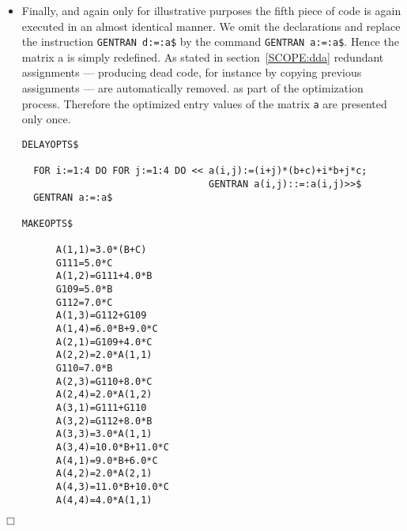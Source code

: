 \begin{itemize}
{\begin{verbatim}
DELAYDECS$

  GENTRAN DECLARE <<a(4,4),d(4,4),b,c:real>>$

  DELAYOPTS$

    FOR i:=1:4 DO FOR j:=1:4 DO << a(i,j):=(i+j)*(b+c)+i*b+j*c;
                                   GENTRAN a(i,j)::=:a(i,j)>>$
    GENTRAN d:=:a$

  MAKEOPTS$

MAKEDECS$

      REAL B,C,G56,G54,G57,G55,A(4,4),D(4,4)
      A(1,1)=3.0*(B+C)
      G56=5.0*C
      A(1,2)=G56+4.0*B
      G54=5.0*B
      G57=7.0*C
      A(1,3)=G57+G54
      A(1,4)=6.0*B+9.0*C
      A(2,1)=G54+4.0*c
      A(2,2)=2.0*A(1,1)
      G55=7.0*B
      A(2,3)=G55+8.0*C
      A(2,4)=2.0*A(1,2)
      A(3,1)=G56+G55
      A(3,2)=G57+8.0*B
      A(3,3)=3.0*A(1,1)
      A(3,4)=10.0*B+11.0*C
      A(4,1)=9.0*B+6.0*C
      A(4,2)=2.0*A(2,1)
      A(4,3)=11.0*B+10.0*C
      A(4,4)=4.0*A(1,1)
      D(1,1)=A(1,1)
      D(1,2)=A(1,2)
      D(1,3)=A(1,3)
      D(1,4)=A(1,4)
      D(2,1)=A(2,1)
      D(2,2)=A(2,2)
      D(2,3)=A(2,3)
      D(2,4)=A(2,4)
      D(3,1)=A(3,1)
      D(3,2)=A(3,2)
      D(3,3)=A(3,3)
      D(3,4)=A(3,4)
      D(4,1)=A(4,1)
      D(4,2)=A(4,2)
      D(4,3)=A(4,3)
      D(4,4)=A(4,4)
\end{verbatim}}
\item Finally, and again only for illustrative purposes the fifth piece of
code is again executed in an almost identical manner. We omit the declarations
and replace the instruction {\tt GENTRAN d:=:a}\verb+$+ by the command
{\tt GENTRAN a:=:a}\verb+$+. Hence the matrix a is simply redefined. As
stated in section~\ref{SCOPE:dda} redundant assignments --- producing dead
code, for instance by copying previous assignments --- are automatically 
removed. as part of the optimization process. Therefore the optimized
entry values of the matrix {\tt a} are presented only once.
{\small
\begin{verbatim}
DELAYOPTS$

  FOR i:=1:4 DO FOR j:=1:4 DO << a(i,j):=(i+j)*(b+c)+i*b+j*c;
                                 GENTRAN a(i,j)::=:a(i,j)>>$
  GENTRAN a:=:a$

MAKEOPTS$

      A(1,1)=3.0*(B+C)
      G111=5.0*C
      A(1,2)=G111+4.0*B
      G109=5.0*B
      G112=7.0*C
      A(1,3)=G112+G109
      A(1,4)=6.0*B+9.0*C
      A(2,1)=G109+4.0*C
      A(2,2)=2.0*A(1,1)
      G110=7.0*B
      A(2,3)=G110+8.0*C
      A(2,4)=2.0*A(1,2)
      A(3,1)=G111+G110
      A(3,2)=G112+8.0*B
      A(3,3)=3.0*A(1,1)
      A(3,4)=10.0*B+11.0*C
      A(4,1)=9.0*B+6.0*C
      A(4,2)=2.0*A(2,1)
      A(4,3)=11.0*B+10.0*C
      A(4,4)=4.0*A(1,1)
\end{verbatim}}
\end{itemize}
{\small
\begin{flushright}
$\Box$
\end{flushright}}

